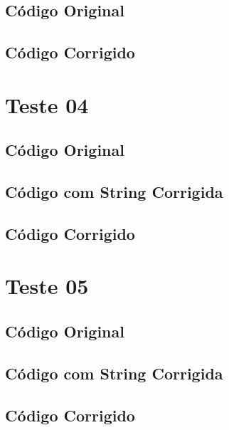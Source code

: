 \subsection{Código Original}


\subsection{Código Corrigido}


\section{Teste 04}
\label{subsec:teste04}

\subsection{Código Original}


\subsection{Código com String Corrigida}


\subsection{Código Corrigido}


\section{Teste 05}
\label{subsec:teste05}

\subsection{Código Original}


\subsection{Código com String Corrigida}


\subsection{Código Corrigido}


